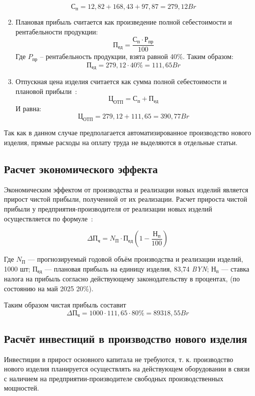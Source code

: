 \begin{enumerate}
$$С_п = 12,82 + 168,43 + 97,87 = 279,12 Br$$ 

\item Плановая прибыль считается как произведение полной себестоимости и рентабельности продукции:
  \begin{equation}
    П_{ед}= \frac{С_п \cdot Р_{пр}}{100}
  \end{equation}
  Где  $P_{пр}$ – рентабельность продукции, взята равной 40\%.
  Таким образом:
$$ П_{ед} = 279,12 \cdot 40\% = 111,65 Br$$

\item Отпускная цена изделия считается как сумма полной себестоимости
  и плановой прибыли~\cite{bsuir-project-economics}:
  \begin{equation}
    Ц_{ОТП}=С_п+П_{ед}
  \end{equation}
  И равна: $$Ц_{ОТП}=279,12+111,65= 390,77Br$$ 
\end{enumerate}

Так как в данном случае предполагается автоматизированное производство
нового изделия, прямые расходы на оплату труда не выделяются в
отдельные статьи.

\subsection{Расчет экономического эффекта}

Экономическим эффектом от производства и реализации новых изделий
является прирост чистой прибыли, полученной от их реализации.  Расчет
прироста чистой прибыли у предприятия-производителя от реализации
новых изделий осуществляется по
формуле~\cite{bsuir-project-economics}:

\begin{equation}
  \Delta П_ч=N_П \cdot П_{ед} ( 1- \frac{Н_п}{100} )
\end{equation}

Где $N_П$ — прогнозируемый годовой объём производства и реализации изделий, 1000 шт;
$П_{ед}$ — плановая прибыль на единицу изделия, 83,74 \textit{BYN};
$Н_п$ — ставка налога на прибыль согласно действующему законодательству в процентах,
(по состоянию на май 2025 20\%).

Таким образом чистая прибыль составит
$$  \Delta П_ч = 1000 \cdot 111,65 \cdot 80\% = 89 318,55Br$$


\subsection{Расчёт инвестиций в производство нового изделия}
Инвестиции в прирост основного капитала не требуются,
т. к. производство нового изделия планируется осуществлять на
действующем оборудовании в связи с наличием на
предприятии-производителе свободных производственных мощностей.

